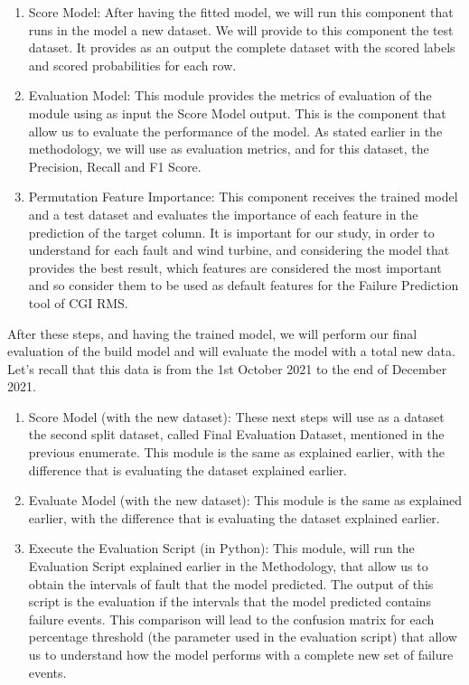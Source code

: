 \begin{enumerate}
    \item{Score Model:}
After having the fitted model, we will run this component that runs in the model a new dataset. We will provide to this component the test dataset. It provides as an output the complete dataset with the scored labels and scored probabilities for each row.
    
    \item{Evaluation Model:}
This module provides the metrics of evaluation of the module using as input the Score Model output. This is the component that allow us to evaluate the performance of the model. As stated earlier in the methodology, we will use as evaluation metrics, and for this dataset, the Precision, Recall and F1 Score.
    
    \item{Permutation Feature Importance:}
This component receives the trained model and a test dataset and evaluates the importance of each feature in the prediction of the target column.
It is important for our study, in order to understand for each fault and wind turbine, and considering the model that provides the best result, which features are considered the most important and so consider them to be used as default features for the Failure Prediction tool of CGI RMS.
\end{enumerate}

After these steps, and having the trained model, we will perform our final evaluation of the build model and will evaluate the model with a total new data. Let's recall that this data is from the 1st October 2021 to the end of December 2021.

\begin{enumerate}
    \item{Score Model (with the new dataset):}
These next steps will use as a dataset the second split dataset, called Final Evaluation Dataset, mentioned in the previous enumerate.
This module is the same as explained earlier, with the difference that is evaluating the dataset explained earlier.

    \item{Evaluate Model (with the new dataset):}
This module is the same as explained earlier, with the difference that is evaluating the dataset explained earlier.
    
    \item{Execute the Evaluation Script (in Python):}
This module, will run the Evaluation Script explained earlier in the Methodology, that allow us to obtain the intervals of fault that the model predicted. The output of this script is the evaluation if the intervals that the model predicted contains failure events. This comparison will lead to the confusion matrix for each percentage threshold (the parameter used in the evaluation script) that allow us to understand how the model performs with a complete new set of failure events.
\end{enumerate}


